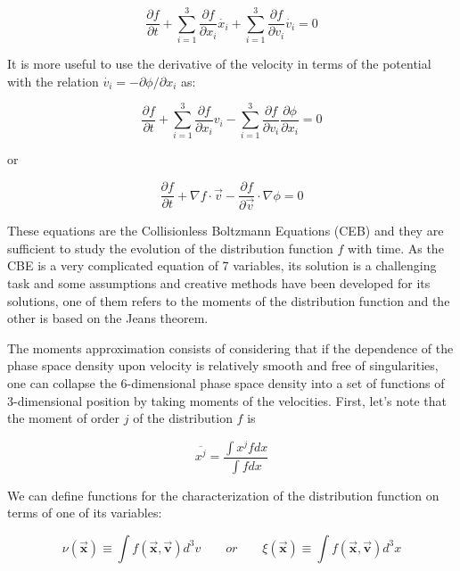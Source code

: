 \begin{equation}
\frac{\partial f}{\partial t}+\sum_{i=1}^{3}\frac{\partial f}{\partial x_{i}}\dot{x_{i}}+\sum_{i=1}^{3}\frac{\partial f}{\partial v_{i}}\dot{v_{i}}=0
\end{equation}

It is more useful to use the derivative of the velocity in terms of the potential with the relation $\dot{v_{i}}=-\partial\phi / \partial x_{i}$ as:

\begin{equation}
\frac{\partial f}{\partial t}+\sum_{i=1}^{3}\frac{\partial f}{\partial x_{i}}v_{i}-\sum_{i=1}^{3}\frac{\partial f}{\partial v_{i}}\frac{\partial\phi}{\partial x_{i}}=0
\end{equation}

or

\begin{equation}
\frac{\partial f}{\partial t}+\nabla f\cdot\vec{v}-\frac{\partial f}{\partial\overrightarrow{v}}\cdot\nabla\phi=0
\end{equation}

These equations are the Collisionless Boltzmann Equations (CEB) and they are sufficient to study the evolution of the distribution function $f$ with time. As the CBE is a very complicated equation of 7 variables, its solution is a challenging task and some assumptions and creative methods have been developed for its solutions, one of them refers to the moments of the distribution function and the other is based on the Jeans theorem.

The moments approximation consists of considering that if the dependence of the phase space density upon velocity is relatively smooth and free of singularities, one can collapse the 6-dimensional phase space density into a set of functions of 3-dimensional position by taking moments of the velocities. First, let's note that the moment of order $j$ of the distribution $f$ is

\begin{equation}
\overline{x^{j}}=\frac {\int x^{j}fdx}{\int fdx}
\end{equation}

We can define functions for the characterization of the distribution function on terms of one of its variables:

\begin{equation}
\nu(\vec{\textbf{x}})\equiv \int f(\vec{\textbf{x}},\vec{\textbf{v}})d^{3}v\quad\quad or \quad\quad  \xi(\vec{\textbf{x}})\equiv \int f(\vec{\textbf{x}},\vec{\textbf{v}})d^{3}x
\end{equation}


